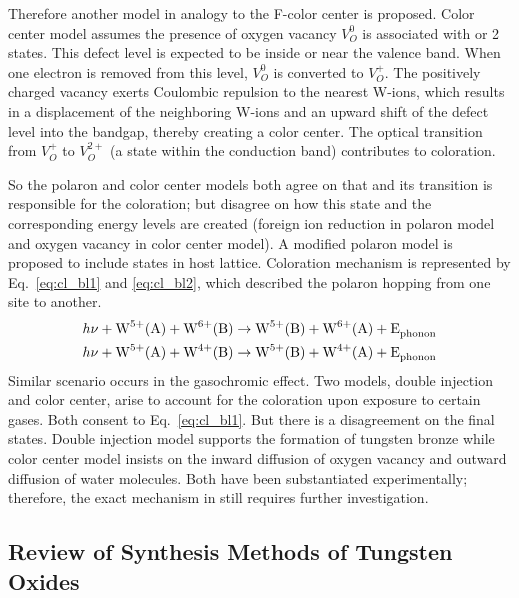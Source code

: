Therefore another model in analogy to the F-color center is proposed. Color center model assumes the presence of oxygen vacancy $V_O^0$ is associated with  or 2 states. This defect level is expected to be inside or near the valence band. When one electron is removed from this level, $V_O^0$ is converted to $V_O^+$. The positively charged vacancy exerts Coulombic repulsion to the nearest W-ions, which results in a displacement of the neighboring W-ions and an upward shift of the defect level into the bandgap, thereby creating a color center. The optical transition from $V_O^+$ to $V_O^{2+}$ (a state within the conduction band) contributes to coloration.\cite{Deb2008}

So the polaron and color center models both agree on that  and its transition is responsible for the coloration; but disagree on how this  state and the corresponding energy levels are created (foreign ion reduction in polaron model and oxygen vacancy in color center model). A modified polaron model is proposed to include  states in host lattice. Coloration mechanism is represented by Eq.~\ref{eq:cl_bl1} and \ref{eq:cl_bl2}, which described the polaron hopping from one site to another.\cite{Chatten2005}
\begin{align}
h\nu +\ce{W^{5+}(A)} +  \ce{W^{6+}(B)} &\rightarrow \ce{W^{5+}(B)} + \ce{W^{6+}(A) + E_{phonon}} \label{eq:cl_bl1}\\
h\nu +\ce{W^{5+}(A)} +  \ce{W^{4+}(B)} &\rightarrow \ce{W^{5+}(B)} + \ce{W^{4+}(A) + E_{phonon}} \label{eq:cl_bl2}
\end{align}
Similar scenario occurs in the gasochromic effect. Two models, double injection and color center, arise to account for the coloration upon exposure to certain gases. Both consent to Eq.~\ref{eq:cl_bl1}. But there is a disagreement on the final states. Double injection model supports the formation of tungsten bronze  while color center model insists on the inward diffusion of oxygen vacancy and outward diffusion of water molecules. Both have been substantiated experimentally;\cite{Zhu2010} therefore, the exact mechanism in  still requires further investigation.

\subsection{Review of Synthesis Methods of Tungsten Oxides}\label{sec:woxgrowth}

